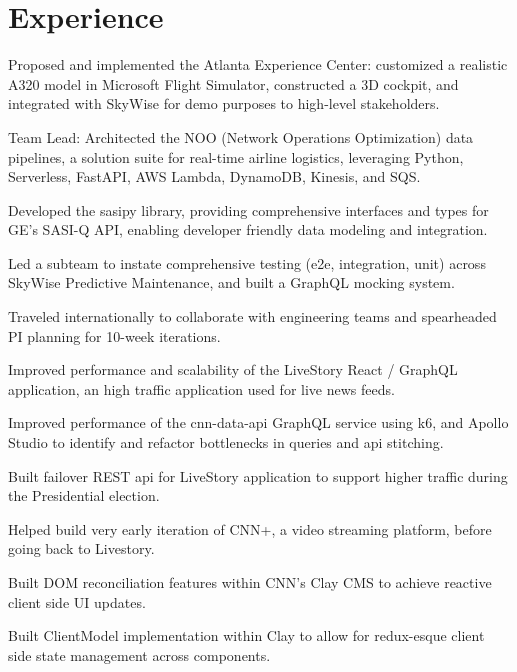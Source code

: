 \documentclass[]{pb-resume-openfonts}
\begin{document}
\begin{minipage}[t]{0.66\textwidth} 

\section{Experience}
\vspace{\topsep} %
\begin{tightemize}

\item Proposed and implemented the Atlanta Experience Center: customized a realistic A320 model in Microsoft Flight Simulator, constructed a 3D cockpit, and integrated with SkyWise for demo purposes to high-level stakeholders.
\item Team Lead: Architected the NOO (Network Operations Optimization) data pipelines, a solution suite for real-time airline logistics, leveraging Python, Serverless, FastAPI, AWS Lambda, DynamoDB, Kinesis, and SQS.
\item Developed the sasipy library, providing comprehensive interfaces and types for GE's SASI-Q API, enabling developer friendly data modeling and integration.
\item Led a subteam to instate comprehensive testing (e2e, integration, unit) across SkyWise Predictive Maintenance, and built a GraphQL mocking system.
\item Traveled internationally to collaborate with engineering teams and spearheaded PI planning for 10-week iterations.

\end{tightemize}
\sectionsep

\vspace{\topsep} %
\begin{tightemize}
\item Improved performance and scalability of the LiveStory React / GraphQL application, an high traffic application used for live news feeds.
\item Improved performance of the cnn-data-api GraphQL service using k6, and Apollo Studio to identify and refactor bottlenecks in queries and api stitching.
\item Built failover REST api for LiveStory application to support higher traffic during the Presidential election.
\item Helped build very early iteration of CNN+, a video streaming platform, before going back to Livestory. 
\item Built DOM reconciliation features within CNN's Clay CMS to achieve reactive client side UI updates.
\item Built ClientModel implementation within Clay to allow for redux-esque client side state management across components.
\end{tightemize}
\sectionsep



\end{minipage}
\end{document}
